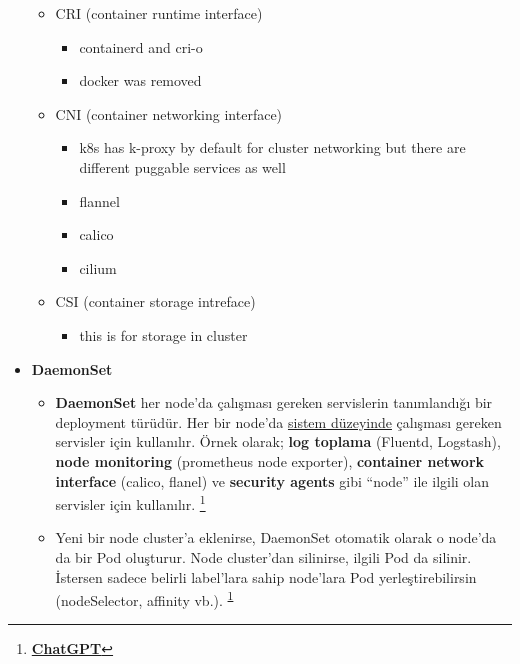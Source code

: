 \documentclass[14pt]{article}
\let\oldhref\href
\renewcommand{\href}[2]{\oldhref{#1}{\textbf{#2}}}
\begin{document}
\begin{itemize}
\begin{itemize}
\item CRI (container runtime interface)
\begin{itemize}
\item containerd and cri-o
\item docker was removed
\end{itemize}
\item CNI (container networking interface)
\begin{itemize}
\item k8s has k-proxy by default for cluster networking but there are different puggable services as well
\item flannel
\item calico
\item cilium
\end{itemize}
\item CSI (container storage intreface)
\begin{itemize}
\item this is for storage in cluster
\end{itemize}
\end{itemize}
\item \textbf{DaemonSet}
\begin{itemize}
\item \textbf{DaemonSet} her node'da çalışması gereken servislerin tanımlandığı bir deployment türüdür. Her bir node'da \uline{sistem düzeyinde} çalışması gereken servisler için kullanılır. Örnek olarak; \textbf{log toplama} (Fluentd, Logstash), \textbf{node monitoring} (prometheus node exporter), \textbf{container network interface} (calico, flanel) ve \textbf{security agents} gibi ``node'' ile ilgili olan servisler için kullanılır. \footnote{\href{https://chatgpt.com/}{ChatGPT}\label{org8a32457}}

\item Yeni bir node cluster’a eklenirse, DaemonSet otomatik olarak o node’da da bir Pod oluşturur. Node cluster’dan silinirse, ilgili Pod da silinir. İstersen sadece belirli label’lara sahip node’lara Pod yerleştirebilirsin (nodeSelector, affinity vb.). \textsuperscript{\ref{org8a32457}}


\end{itemize}
\end{itemize}
\end{document}
